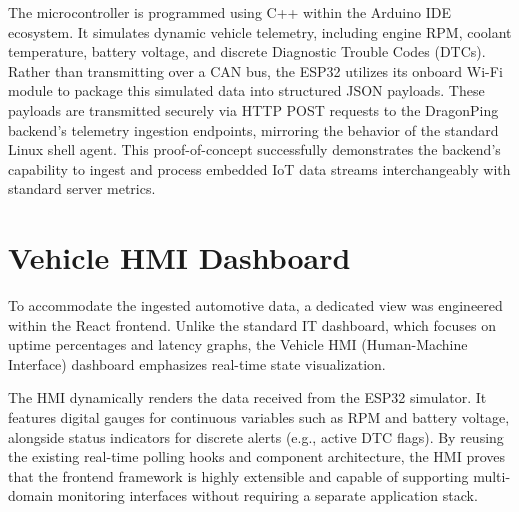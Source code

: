 \documentclass[12pt,a4paper,oneside]{report}
\begin{document}
\noindent The microcontroller is programmed using C++ within the Arduino IDE ecosystem. It simulates dynamic vehicle telemetry, including engine RPM, coolant temperature, battery voltage, and discrete Diagnostic Trouble Codes (DTCs). Rather than transmitting over a CAN bus, the ESP32 utilizes its onboard Wi-Fi module to package this simulated data into structured JSON payloads. These payloads are transmitted securely via HTTP POST requests to the DragonPing backend's telemetry ingestion endpoints, mirroring the behavior of the standard Linux shell agent. This proof-of-concept successfully demonstrates the backend's capability to ingest and process embedded IoT data streams interchangeably with standard server metrics.

\section{Vehicle HMI Dashboard}
\noindent To accommodate the ingested automotive data, a dedicated view was engineered within the React frontend. Unlike the standard IT dashboard, which focuses on uptime percentages and latency graphs, the Vehicle HMI (Human-Machine Interface) dashboard emphasizes real-time state visualization. 

\noindent The HMI dynamically renders the data received from the ESP32 simulator. It features digital gauges for continuous variables such as RPM and battery voltage, alongside status indicators for discrete alerts (e.g., active DTC flags). By reusing the existing real-time polling hooks and component architecture, the HMI proves that the frontend framework is highly extensible and capable of supporting multi-domain monitoring interfaces without requiring a separate application stack.
\end{document}
